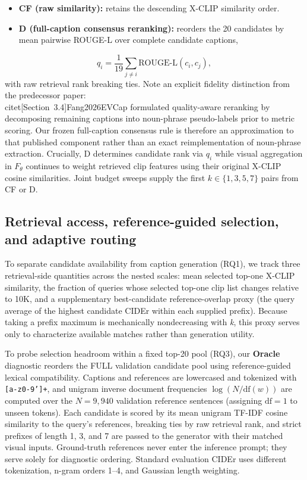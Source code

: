 \documentclass[11pt,a4paper]{article}
\begin{document}
\begin{itemize}
\item \textbf{CF (raw similarity):} retains the descending X-CLIP similarity order.
\item \textbf{D (full-caption consensus reranking):} reorders the 20 candidates by mean pairwise ROUGE-L over complete candidate captions,
\end{itemize}
\begin{equation}
q_i = \frac{1}{19} \sum_{j \ne i} \mathrm{ROUGE\text{-}L}(c_i, c_j),
\end{equation}
with raw retrieval rank breaking ties. Note an explicit fidelity distinction from the predecessor paper: \\citet[Section~3.4]{Fang2026EVCap} formulated quality-aware reranking by decomposing remaining captions into noun-phrase pseudo-labels prior to metric scoring. Our frozen full-caption consensus rule is therefore an approximation to that published component rather than an exact reimplementation of noun-phrase extraction. Crucially, D determines candidate rank via $q_i$ while visual aggregation in $F_\theta$ continues to weight retrieved clip features using their original X-CLIP cosine similarities. Joint budget sweeps supply the first $k \in \{1, 3, 5, 7\}$ pairs from CF or D.

\subsection{Retrieval access, reference-guided selection, and adaptive routing}
To separate candidate availability from caption generation (RQ1), we track three retrieval-side quantities across the nested scales: mean selected top-one X-CLIP similarity, the fraction of queries whose selected top-one clip list changes relative to 10K, and a supplementary best-candidate reference-overlap proxy (the query average of the highest candidate CIDEr within each supplied prefix). Because taking a prefix maximum is mechanically nondecreasing with \emph{k}, this proxy serves only to characterize available matches rather than generation utility.

To probe selection headroom within a fixed top-20 pool (RQ3), our \textbf{Oracle} diagnostic reorders the FULL validation candidate pool using reference-guided lexical compatibility. Captions and references are lowercased and tokenized with \texttt{[a-z0-9']+}, and unigram inverse document frequencies $\log(N / \mathrm{df}(w))$ are computed over the $N = 9{,}940$ validation reference sentences (assigning $\mathrm{df} = 1$ to unseen tokens). Each candidate is scored by its mean unigram TF-IDF cosine similarity to the query's references, breaking ties by raw retrieval rank, and strict prefixes of length 1, 3, and 7 are passed to the generator with their matched visual inputs. Ground-truth references never enter the inference prompt; they serve solely for diagnostic ordering. Standard evaluation CIDEr uses different tokenization, n-gram orders 1--4, and Gaussian length weighting.
\end{document}
